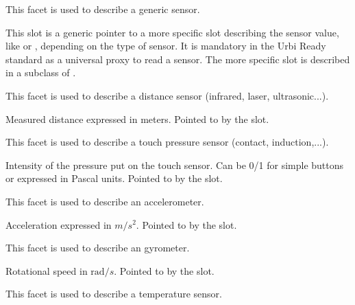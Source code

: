 
This facet is used to describe a generic sensor.

\begin{slots}
  {%
    This slot is a generic pointer to a more specific slot describing
    the sensor value, like  or ,
    depending on the type of sensor. It is mandatory in the Urbi Ready
    standard as a universal proxy to read a sensor. The more specific
    slot is described in a subclass of .%
  }

\end{slots}



This facet is used to describe a distance sensor (infrared, laser,
ultrasonic...).

\begin{slots}
  {%
    Measured distance expressed in meters.  Pointed to by the
     slot.%
  }

\end{slots}



This facet is used to describe a touch pressure sensor (contact,
induction,...).

\begin{slots}
  {%
    Intensity of the pressure put on the touch sensor. Can be 0/1 for
    simple buttons or expressed in Pascal units. Pointed to by the
     slot.%
  }

\end{slots}



This facet is used to describe an accelerometer.

\begin{slots}
  {%
    Acceleration expressed in $m/s^2$.  Pointed to by the 
    slot.%
  }

\end{slots}

This facet is used to describe an gyrometer.

\begin{slots}
  {%
    Rotational speed in $\mathrm{rad}/s$.  Pointed to by the
     slot.%
  }
\end{slots}

This facet is used to describe a temperature sensor.

